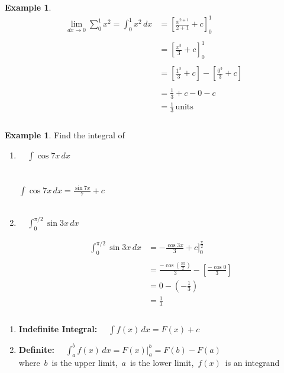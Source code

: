 \documentclass[11pt,a4paper]{article}
\theoremstyle{definition}
\newtheorem{example}[thm]{Example}
\begin{document}
\begin{example}

\begin{align*}
\lim\limits_{dx \rightarrow 0}\sum^1_0 x^2 = \int^1_0 x^2\,dx & = \left[ \frac{x^{2 + 1}}{2  + 1} + c\right]^1_0\\\\
& = \left[\frac{x^3}{3} + c\right]^1_0\\\\
& = \left[\frac{1^3}{3} + c\right] - \left[\frac{0^3}{3} + c\right]\\\\
& = \frac{1}{3} + c - 0 - c\\\
& = \frac{1}{3}\,\text{units}\\\\
\end{align*}
\end{example}
\begin{example}

Find the integral of 

\begin{enumerate}
\item $\quad \displaystyle{\int \cos 7x\,dx}$\\\\

\underline{}\\

$\displaystyle{\int \cos 7x\,dx = \frac{\sin 7x}{7} + c}$\\\\


\item $\quad \displaystyle{\int^{\pi /2}_0 \sin 3x\,dx}$


\begin{align*}
\int^{\pi /2}_0 \sin 3x\,dx & = -\frac{\cos 3x}{3} + c\Bigg]^{\frac{\pi}{2}}_0\\\\
& = \frac{-\cos \left(\frac{3\pi}{2}\right)}{3} - \left[ \frac{-\cos 0}{3}\right]\\\
& = 0 - \left(-\frac{1}{3}\right)\\
& = \frac{1}{3}\\\\
\end{align*}
\end{enumerate}






\begin{enumerate}
\item[$\star$] \textbf{Indefinite Integral:} $\quad \displaystyle{\int f(x) \,dx = F(x) + c}$\\

\item[$\star$] \textbf{Definite:} $\quad  \displaystyle{\int^b_a f(x)\,dx = F(x)\Bigg|^b_a = F(b) - F(a)}$\\
where $\, b\,$ is the upper limit, $\,a\,$ is  the lower limit, $\,f(x)\,$ is an integrand\\\\\\
\end{enumerate}
\end{example}
\end{document}

